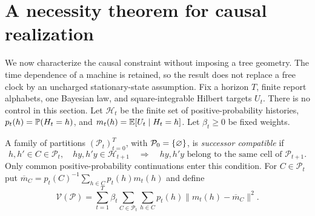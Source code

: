 \section{A necessity theorem for causal realization}\label{sec:v8-congruence}
We now characterize the causal constraint without imposing a tree
geometry. The time dependence of a machine is retained, so the result
does not replace a free clock by an uncharged stationary-state assumption.
Fix a horizon $T$, finite report alphabets, one Bayesian law, and
square-integrable Hilbert targets $U_t$. There is no control in this
section. Let $\mathcal H_t$ be the finite set of positive-probability
histories, $p_t(h)=\mathbb P(H_t=h)$, and
$m_t(h)=\mathbb E[U_t\mid H_t=h]$. Let $\beta_t\ge0$ be fixed weights.

A family of partitions $(\mathcal P_t)_{t=0}^T$, with
$\mathcal P_0=\{\varnothing\}$, is \emph{successor compatible} if
\begin{equation}
 h,h'\in C\in\mathcal P_t,\quad hy,h'y\in\mathcal H_{t+1}
 \quad\Longrightarrow\quad
 hy,h'y\text{ belong to the same cell of }\mathcal P_{t+1}.
                                                               \label{eq:v8-congruence}
\end{equation}
Only common positive-probability continuations enter this condition.
For $C\in\mathcal P_t$ put
$\overline m_C=p_t(C)^{-1}\sum_{h\in C}p_t(h)m_t(h)$ and define
\begin{equation}
 \mathcal V(\mathcal P)=
 \sum_{t=1}^T\beta_t\sum_{C\in\mathcal P_t}
              \sum_{h\in C}p_t(h)\|m_t(h)-\overline m_C\|^2.
                                                               \label{eq:v8-variancefunctional}
\end{equation}

